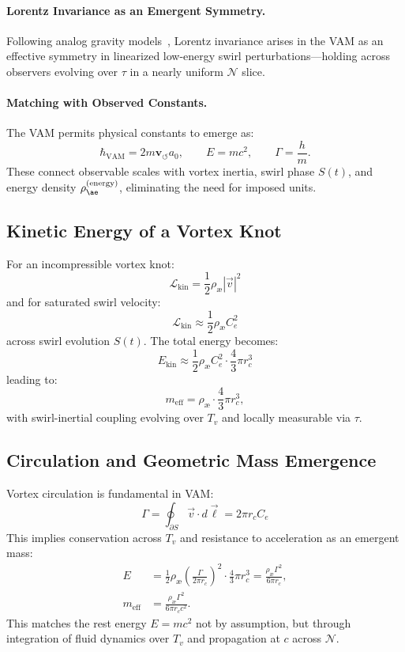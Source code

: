 \paragraph{Lorentz Invariance as an Emergent Symmetry.}
Following analog gravity models~\cite{barcelo2011}, Lorentz invariance arises in the VAM as an effective symmetry in linearized low-energy swirl perturbations—holding across observers evolving over $\tau$ in a nearly uniform $\mathcal{N}$ slice.

\paragraph{Matching with Observed Constants.}
The VAM permits physical constants to emerge as:
\[
    \hbar_{\text{VAM}} = 2 m \mathbf{v}_{\scriptscriptstyle\boldsymbol{\circlearrowleft}} a_0, \qquad E = m c^2, \qquad \Gamma = \frac{h}{m}.
\]
These connect observable scales with vortex inertia, swirl phase $S(t)$, and energy density $\rho_{\ae}^{(\text{energy})}$, eliminating the need for imposed units.

\subsection{Kinetic Energy of a Vortex Knot}

For an incompressible vortex knot:
\begin{equation}
    \mathcal{L}_\text{kin} = \frac{1}{2} \rho_\text{\ae} |\vec{v}|^2
\end{equation}
and for saturated swirl velocity:
\[
    \mathcal{L}_\text{kin} \approx \frac{1}{2} \rho_\text{\ae} C_e^2
\]
across swirl evolution $S(t)$. The total energy becomes:
\[
    E_\text{kin} \approx \frac{1}{2} \rho_\text{\ae} C_e^2 \cdot \frac{4}{3} \pi r_c^3
\]
leading to:
\[
    m_\text{eff} = \rho_\text{\ae} \cdot \frac{4}{3} \pi r_c^3,
\]
with swirl-inertial coupling evolving over $T_v$ and locally measurable via $\tau$.

\subsection{Circulation and Geometric Mass Emergence}

Vortex circulation is fundamental in VAM:
\[
    \Gamma = \oint_{\partial S} \vec{v} \cdot d\vec{\ell} = 2\pi r_c C_e
\]
This implies conservation across $T_v$ and resistance to acceleration as an emergent mass:
\begin{align}
    E &= \frac{1}{2} \rho_\text{\ae} \left( \frac{\Gamma}{2\pi r_c} \right)^2 \cdot \frac{4}{3} \pi r_c^3
    = \frac{\rho_\text{\ae} \Gamma^2}{6\pi r_c}, \\
    m_\text{eff} &= \frac{\rho_\text{\ae} \Gamma^2}{6\pi r_c c^2}.
\end{align}
This matches the rest energy \( E = m c^2 \) not by assumption, but through integration of fluid dynamics over $T_v$ and propagation at $c$ across $\mathcal{N}$.

